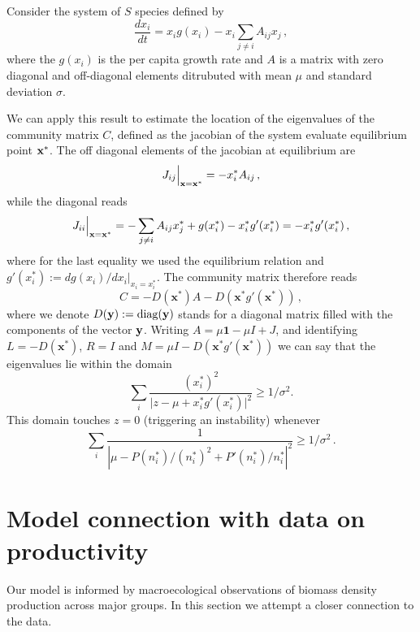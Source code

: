 \documentclass[10pt]{article}
\begin{document}
Consider the system of $S$ species defined by
\begin{equation}
    \frac{dx_i}{dt} = x_ig(x_i) - x_i\sum_{j\neq i}A_{ij}x_j \, ,
\end{equation}
where the $g(x_i)$ is the per capita growth rate and $A$ is a matrix with
zero diagonal and off-diagonal elements
ditrubuted with mean $\mu$ and standard deviation $\sigma$.

We can apply this result to estimate the location of the eigenvalues 
of the community matrix $C$, defined as the jacobian of the system
evaluate equilibrium point $\bf{x}^*$.
The off diagonal elements of the jacobian at equilibrium are
\begin{equation}
    J_{ij}\Big{|}_{\bf{x}=\bf{x}^*} = -x_i^*A_{ij} \, ,
\end{equation}
while the diagonal reads
\begin{equation}
    J_{ii}\Big{|}_{\bf{x}=\bf{x}^*} = -\sum_{j\neq i}A_{ij}x_j^* + g(x_i^*)-x_i^*g'(x_i^*) 
    = -x_i^*g'(x_i^*) \, ,
\end{equation}
where for the last equality we used the equilibrium relation and $g'(x_i^*):=d g(x_i)/dx_i|_{x_i=x_i^*}$.
The community matrix therefore reads
\begin{equation}
    C = -D(\mathbf x^*)A - D(\mathbf x^*g'(\mathbf x^*)) \, ,
\end{equation}
where we denote $D(\bf{y}):=\textrm{diag}(\bf{y})$ stands for a diagonal matrix
filled with the components of the vector $\bf{y}$.
Writing $A = \mu \mathbf{1} - \mu I + J$, and identifying 
$L = -D(\mathbf x^*)$, $R = I$ and $M = \mu I -  D(\mathbf x^*g'(\mathbf x^*))$
we can say that the eigenvalues lie within the domain
\begin{equation}
\sum_{i} \frac{(x_i^*)^2}{\vert z -\mu + x_i^*g'(x_i^*)\vert ^2}\geq 1/\sigma^2. 
\end{equation} 
This domain touches $z = 0$ (triggering an instability) whenever
\begin{equation}
    \sum_i \frac{1}{|\mu -P(n_i^*)/(n_i^*)^2+P'(n_i^*)/n_i^*|^2}\geq 1/\sigma^2 \, .
\end{equation}

\section{Model connection with data on productivity}
Our model is informed by macroecological observations
of biomass density production across major groups.
In this section we attempt a closer connection to the data.
\end{document}
